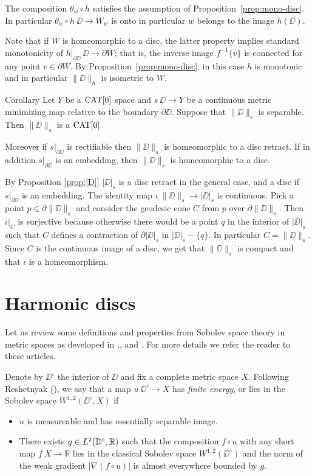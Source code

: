 \documentclass{article}
\begin{document}
The composition $\theta_w\circ h$ satisfies the assumption of  Proposition~\ref{prop:mono-disc}.
In particular $\theta_w\circ h\:\DD\to W_w$ is onto in particular $w$ belongs to the image $h(\DD)$.


Note that if $W$ is homeomorphic to a disc, the latter property implies standard monotonicity of $h|_{\partial\DD}\:\DD\to\partial W$;
that is, the inverse image $f^{-1}\{v\}$ is connected for any point $v\in\partial W$.
By Proposition~\ref{prop:mono-disc}, in this case $h$ is monotonic and in particular $\|\DD\|_h$ is isometric to $W$.
\qeds


\begin{thm}{Corollary}\label{cor:main}
Let $Y$ be a $\mathop{\rm CAT}\nolimits[0]$ space 
and $s\:\DD\to Y$ be a continuous metric minimizing map relative to the boundary $\partial\DD$.
Suppose that $\|\DD\|_s$  is separable.
Then $\|\DD\|_s$ is a $\mathop{\rm CAT}\nolimits[0]$

Moreover if $s|_{\partial\DD}$ is rectifiable then $\|\DD\|_s$ is homeomorphic to a  disc retract. 
If in addition  $s|_{\partial\DD}$ is an embedding,
then $\|\DD\|_s$ is homeomorphic to a disc.
\end{thm}

By Proposition \ref{prop:|D|} $|\DD|_s$ is a disc retract in the general case, and a disc if $s|_{\partial\DD}$ is an embedding.
The identity map $\iota\:\|\DD\|_s\to |\DD|_s$ is continuous.
Pick a point $p\in\partial\|\DD\|_s$ and consider the geodesic 
cone $C$ from $p$ over $\partial\|\DD\|_s$.
Then $\iota|_C$ is surjective because otherwise there would be a point $q$ in the 
interior of $|\DD|_s$ such that $C$ defines a contraction of $\partial|\DD|_s$ in $|\DD|_s-\{q\}$. 
In particular $C=\|\DD\|_s$.
Since $C$ is the continuous image of a disc, we get that $\|\DD\|_s$ is compact and that $\iota$ is a homeomorphism.
\qeds

\section{Harmonic discs}\label{Harmonic discs}

Let us review some definitions and properties from Sobolev space theory in metric spaces as developed in 
\cite{KS},\cite{R}, \cite{HKST} and \cite{LW}. 
For more details we refer the reader to these articles.

Denote by  $\DD^\circ$ the interior of $\DD$ and fix a complete metric space $X$.
Following Reshetnyak (\cite{R}), we say that a map $u\:\DD^\circ\to X$ has {\em finite energy}, or lies in the Sobolev space $W^{1,2}(\DD^\circ,X)$ if
\begin{itemize}
 \item $u$ is measureable and has essentially separable image. %
 \item There exists $g\in L^2(\mathbb{D}^\circ,\mathbb{R})$ such that the composition $f\circ u$ with any short map $f\:X\to \mathbb{R}$ 
lies in the classical Sobolev space $W^{1,2}(\DD^\circ)$
 and the norm of the weak gradient $|\nabla(f\circ u)|$ is almost everywhere bounded by $g$.
\end{itemize}
\end{document}
